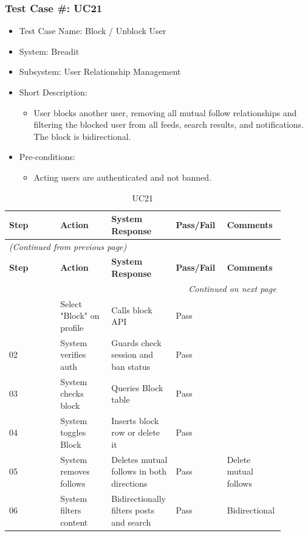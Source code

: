 \subsubsection{Test Case \#: UC21}
\begin{itemize}
  \item Test Case Name: Block / Unblock User
  \item System: Breadit
  \item Subsystem: User Relationship Management
  \item Short Description:
\begin{itemize}
  \item User blocks another user, removing all mutual follow relationships and filtering the blocked user from all feeds, search results, and notifications. The block is bidirectional.
\end{itemize}
  \item Pre-conditions:
\begin{itemize}
  \item Acting users are authenticated and not banned.
\end{itemize}
\end{itemize}

\begin{longtable}{|p{0.18\linewidth}|p{0.18\linewidth}|p{0.18\linewidth}|p{0.18\linewidth}|p{0.18\linewidth}|}
\caption{UC21} \label{tab:37} \\
\hline
\textbf{Step} & \textbf{Action} & \textbf{System Response} & \textbf{Pass/Fail} & \textbf{Comments} \\
\hline
\endfirsthead
\multicolumn{5}{l}{\textit{(Continued from previous page)}} \\
\hline
\textbf{Step} & \textbf{Action} & \textbf{System Response} & \textbf{Pass/Fail} & \textbf{Comments} \\
\hline
\endhead
\hline \multicolumn{5}{r}{\textit{Continued on next page}} \\
\endfoot
\hline
\endlastfoot
01 & Select "Block" on profile & Calls block API & Pass &  \\
\hline
02 & System verifies auth & Guards check session and ban status & Pass &  \\
\hline
03 & System checks block & Queries Block table & Pass &  \\
\hline
04 & System toggles Block & Inserts block row or delete it & Pass &  \\
\hline
05 & System removes follows & Deletes mutual follows in both directions & Pass & Delete mutual follows \\
\hline
06 & System filters content & Bidirectionally filters posts and search & Pass & Bidirectional \\
\hline
\end{longtable}

